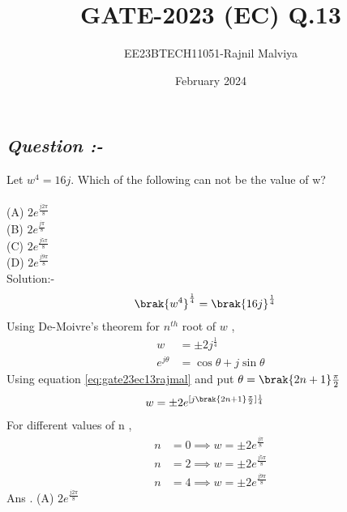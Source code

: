 \documentclass[journal,12pt,twocolumn]{IEEEtran}
\theoremstyle{remark}
\begin{document}
\title{GATE-2023 (EC)  Q.13}
\author{EE23BTECH11051-Rajnil Malviya}
\date{February 2024}
\maketitle
\subsection*{\textit{Question :-}}
Let $ w ^{4} = 16j $. Which of the following can not be the value of w?\\\\
(A)   $2e^\frac{j2 \pi}{8}$\\
(B)   $2e^\frac{j \pi}{8}$\\
(C)   $2e^\frac{j5 \pi}{8}$\\
(D)   $2e^\frac{j9 \pi}{8}$\\
Solution:-
\begin{align}
  \brak{w^4}^{\frac{1}{4}} &= \brak{16 j}^{\frac{1}{4}}
\end{align}
Using De-Moivre's theorem for $n^{th}$ root of $w$ ,
\begin{align}
    w &= \pm 2j^{\frac{1}{4}}\\
    e^{j\theta} &= \cos{\theta}+j\sin{\theta}\label{eq:gate23ec13rajmal}
    \end{align}
    Using equation \eqref{eq:gate23ec13rajmal} and put $\theta =\brak {2n+1} \frac{\pi}{2}$
    \begin{align}
     w &=\pm2e^{ [j \brak {2n+1} \frac{\pi}{2}] \frac{1}{4}}
\end{align}
For different values of n ,
\begin{align}
    n&=0 \implies w =\pm2e^{ \frac{j \pi}{8}}\\
     n&=2 \implies w =\pm2e^{ \frac{j 5\pi}{8}}\\
      n&=4 \implies w =\pm2e^{ \frac{j 9\pi}{8}}
\end{align}
Ans . (A) $2e^\frac{j2 \pi}{8}$
\end{document}
